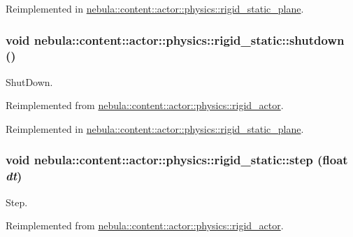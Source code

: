 Reimplemented in \hyperlink{classnebula_1_1content_1_1actor_1_1physics_1_1rigid__static__plane_af65fe2333f202fcf0dc9b95f00793c88}{nebula::content::actor::physics::rigid\_\-static\_\-plane}.\hypertarget{classnebula_1_1content_1_1actor_1_1physics_1_1rigid__static_acbf24424c29fa78f568f67fe80cee108}{
\subsubsection[{shutdown}]{\setlength{\rightskip}{0pt plus 5cm}void nebula::content::actor::physics::rigid\_\-static::shutdown ()}}
\label{classnebula_1_1content_1_1actor_1_1physics_1_1rigid__static_acbf24424c29fa78f568f67fe80cee108}


ShutDown. 

Reimplemented from \hyperlink{classnebula_1_1content_1_1actor_1_1physics_1_1rigid__actor_a19cfcb68b5be57574d96ffe856131aed}{nebula::content::actor::physics::rigid\_\-actor}.

Reimplemented in \hyperlink{classnebula_1_1content_1_1actor_1_1physics_1_1rigid__static__plane_a2ccd43a02a417f4690bc9174e4bf533a}{nebula::content::actor::physics::rigid\_\-static\_\-plane}.\hypertarget{classnebula_1_1content_1_1actor_1_1physics_1_1rigid__static_a83be7bda449d94b5d7a69c8b8f99f6de}{
\subsubsection[{step}]{\setlength{\rightskip}{0pt plus 5cm}void nebula::content::actor::physics::rigid\_\-static::step (float {\em dt})}}
\label{classnebula_1_1content_1_1actor_1_1physics_1_1rigid__static_a83be7bda449d94b5d7a69c8b8f99f6de}


Step. 

Reimplemented from \hyperlink{classnebula_1_1content_1_1actor_1_1physics_1_1rigid__actor_a8d53c36044b639537cecff87ef9f84f1}{nebula::content::actor::physics::rigid\_\-actor}.

